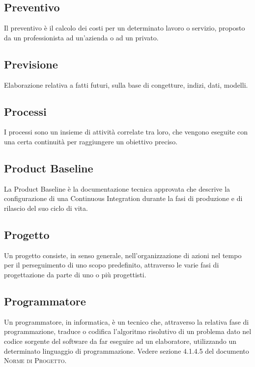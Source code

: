 \subsection*{Preventivo}
Il preventivo è il calcolo dei costi per un determinato lavoro o servizio, proposto da un professionista ad un'azienda o ad un privato.

\subsection*{Previsione}
Elaborazione relativa a fatti futuri, sulla base di congetture, indizi, dati, modelli.

\subsection*{Processi}
I processi sono un insieme di attività correlate tra loro, che vengono eseguite con una certa continuità per raggiungere un obiettivo preciso.

\subsection*{Product Baseline}
La Product Baseline è la documentazione tecnica approvata che descrive la configurazione di una Continuous Integration durante la fasi di produzione e di rilascio del suo ciclo di vita.

\subsection*{Progetto}
Un progetto consiste, in senso generale, nell'organizzazione di azioni nel tempo per il perseguimento di uno scopo predefinito, attraverso le varie fasi di progettazione da parte di uno o più progettisti.

\subsection*{Programmatore}
Un programmatore, in informatica, è un tecnico che, attraverso la relativa fase di programmazione, traduce o codifica l'algoritmo risolutivo di un problema dato nel codice sorgente del software da far eseguire ad un elaboratore, utilizzando un determinato linguaggio di programmazione. Vedere sezione 4.1.4.5 del documento \textsc{Norme di Progetto}.

